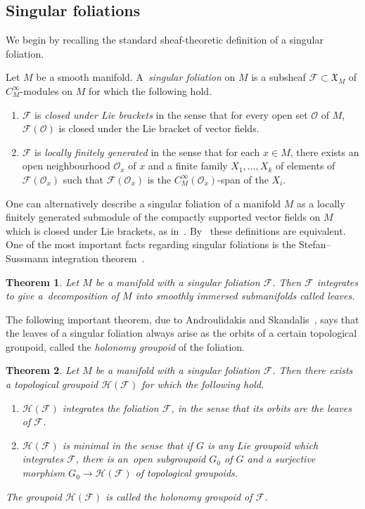 \documentclass[pdftex]{sigma}
\numberwithin{equation}{section}
\newtheorem{Theorem}{Theorem}[section]
\def\FF{{\mathcal{F}}}
\def\HH{{\mathcal{H}}}
\def\OO{{\mathcal{O}}}
\def\XF{{\mathfrak{X}}}
\begin{document}
\subsection{Singular foliations}

We begin by recalling the standard sheaf-theoretic definition of a singular foliation.

\begin{Definition}\label{singdef}
Let $M$ be a smooth manifold. A~\textit{singular foliation} on $M$ is a subsheaf $\FF\subset \XF_{M}$ of $C^{\infty}_{M}$-modules on $M$ for which the following hold.
\begin{enumerate}\itemsep=0pt
\item $\FF$ is \textit{closed under Lie brackets} in the sense that for every open set $\OO$ of $M$, $\FF(\OO)$ is closed under the Lie bracket of vector fields.
\item $\FF$ is \textit{locally finitely generated} in the sense that for each $x\in M$, there exists an open neighbourhood $\OO_{x}$ of $x$ and a finite family $X_{1},\dots,X_{k}$ of elements of $\FF(\OO_{x})$ such that $\FF(\OO_{x})$ is the $C^{\infty}_{M}(\OO_{x})$-span of the $X_{i}$.
\end{enumerate}
\end{Definition}

One can alternatively describe a singular foliation of a manifold $M$ as a locally finitely generated submodule of the compactly supported vector fields on $M$ which is closed under Lie brackets, as in~\cite{iakovos2}. By~\cite[Remark 1.8]{GarZam} these definitions are equivalent. One of the most important facts regarding singular foliations is the Stefan--Sussmann integration theorem~\cite{stefan, sussmann}.

\begin{Theorem}%
Let $M$ be a manifold with a singular foliation $\FF$. Then $\FF$ integrates to give a~decom\-position of $M$ into smoothly immersed submanifolds called leaves.
\end{Theorem}

The following important theorem, due to Androulidakis and Skandalis~\cite[Theorem~0.1]{iakovos2}, says that the leaves of a singular foliation always arise as the orbits of a certain topological groupoid, called the \textit{holonomy groupoid} of the foliation.

\begin{Theorem}\label{integrate}
Let $M$ be a manifold with a singular foliation $\FF$. Then there exists a topological groupoid $\HH(\FF)$ for which the following hold.
\begin{enumerate}\itemsep=0pt
\item[$1.$] $\HH(\FF)$ \textit{integrates} the foliation $\FF$, in the sense that its orbits are the leaves of $\FF$.
\item[$2.$] $\HH(\FF)$ is \textit{minimal} in the sense that if $G$ is any Lie groupoid which integrates $\FF$, there is an~open subgroupoid $G_{0}$ of $G$ and a surjective morphism $G_{0}\rightarrow\HH(\FF)$ of topological groupoids.
\end{enumerate}
The groupoid $\HH(\FF)$ is called the \textit{holonomy groupoid} of $\FF$.
\end{Theorem}
\end{document}
